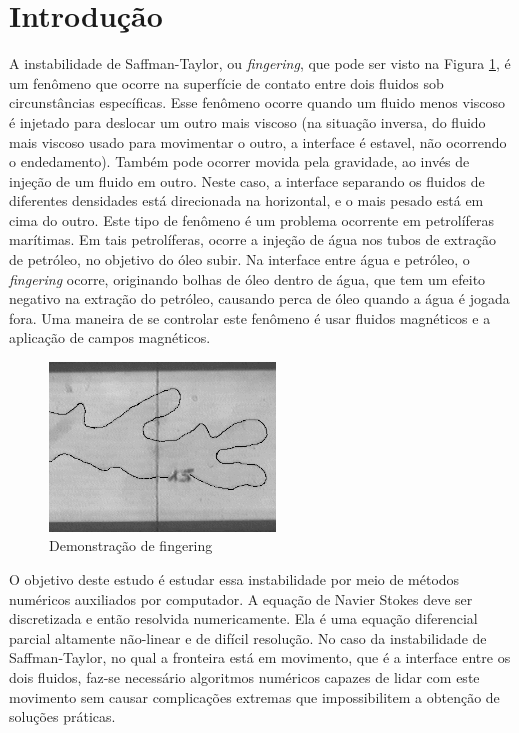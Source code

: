 \documentclass[journal]{IEEEtran}
\begin{document}
\section{Introdução}
A instabilidade de Saffman-Taylor, ou \textit{fingering}, que pode ser visto na Figura \ref{finger}, é um fenômeno que ocorre na superfície de contato entre dois fluidos sob circunstâncias específicas. Esse fenômeno ocorre quando um fluido menos viscoso é injetado para deslocar um outro mais viscoso (na situação inversa, do fluido mais viscoso usado para movimentar o outro, a interface é estavel, não ocorrendo o endedamento). Também pode ocorrer movida pela gravidade, ao invés de injeção de um fluido em outro. Neste caso, a interface separando os fluidos de diferentes densidades está direcionada na horizontal, e o mais pesado está em cima do outro. Este tipo de fenômeno é um problema ocorrente em petrolíferas marítimas. Em tais petrolíferas, ocorre a injeção de água nos tubos de extração de petróleo, no objetivo do óleo subir. Na interface entre água e petróleo, o \textit{fingering} ocorre, originando bolhas de óleo dentro de água, que tem um efeito negativo na extração do petróleo, causando perca de óleo quando a água é jogada fora. Uma maneira de se controlar este fenômeno é usar fluidos magnéticos e a aplicação de campos magnéticos\cite{magnetic_fluids}.
\begin{figure}[!ht]
\centering
\includegraphics[width=6cm]{figures/fingergel.png}
\caption{Demonstração de fingering\label{finger}}
\end{figure}

O objetivo deste estudo é estudar essa instabilidade por meio de métodos numéricos auxiliados por computador. A equação de Navier Stokes deve ser discretizada e então resolvida numericamente. Ela é uma equação diferencial parcial altamente não-linear e de difícil resolução. No caso da instabilidade de Saffman-Taylor, no qual a fronteira está em movimento, que é a interface entre os dois fluidos, faz-se necessário algoritmos numéricos capazes de lidar com este movimento sem causar complicações extremas que impossibilitem a obtenção de soluções práticas\cite{immersed_boundary_methods}. 
\end{document}
